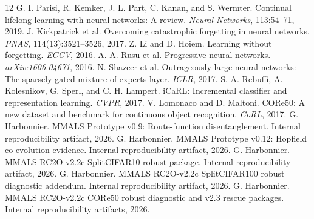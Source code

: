 \documentclass[10pt]{article}
\begin{document}
\begin{thebibliography}{12}
 G. I. Parisi, R. Kemker, J. L. Part, C. Kanan, and S. Wermter. Continual lifelong learning with neural networks: A review. \emph{Neural Networks}, 113:54--71, 2019.
 J. Kirkpatrick et al. Overcoming catastrophic forgetting in neural networks. \emph{PNAS}, 114(13):3521--3526, 2017.
 Z. Li and D. Hoiem. Learning without forgetting. \emph{ECCV}, 2016.
 A. A. Rusu et al. Progressive neural networks. \emph{arXiv:1606.04671}, 2016.
 N. Shazeer et al. Outrageously large neural networks: The sparsely-gated mixture-of-experts layer. \emph{ICLR}, 2017.
 S.-A. Rebuffi, A. Kolesnikov, G. Sperl, and C. H. Lampert. iCaRL: Incremental classifier and representation learning. \emph{CVPR}, 2017.
 V. Lomonaco and D. Maltoni. CORe50: A new dataset and benchmark for continuous object recognition. \emph{CoRL}, 2017.
 G. Harbonnier. MMALS Prototype v0.9: Route-function disentanglement. Internal reproducibility artifact, 2026.
 G. Harbonnier. MMALS Prototype v0.12: Hopfield co-evolution evidence. Internal reproducibility artifact, 2026.
 G. Harbonnier. MMALS RC2O-v2.2c SplitCIFAR10 robust package. Internal reproducibility artifact, 2026.
 G. Harbonnier. MMALS RC2O-v2.2c SplitCIFAR100 robust diagnostic addendum. Internal reproducibility artifact, 2026.
 G. Harbonnier. MMALS RC2O-v2.2c CORe50 robust diagnostic and v2.3 rescue packages. Internal reproducibility artifacts, 2026.
\end{thebibliography}
\end{document}
